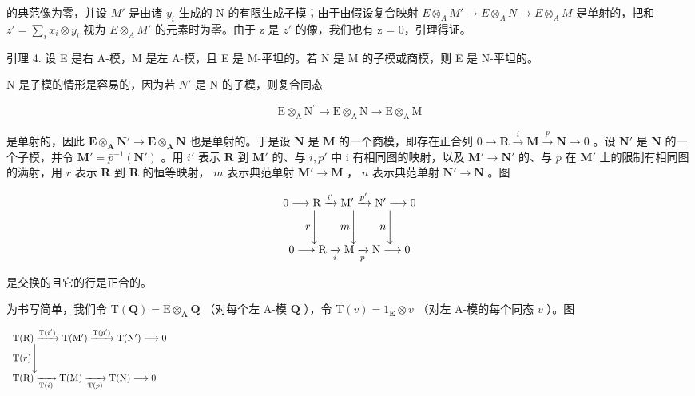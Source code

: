 的典范像为零，并设 \(M'\) 是由诸 \(y_{i}\) 生成的 N 的有限生成子模；由于由假设复合映射 \(E \otimes_{A} M' \to E \otimes_{A} N \to E \otimes_{A} M\) 是单射的，把和 \(z' = \sum_{i} x_{i} \otimes y_{i}\) 视为 \(E \otimes_{A} M'\) 的元素时为零。由于 z 是 \(z'\) 的像，我们也有 z = 0，引理得证。

引理 4. 设 E 是右 A-模，M 是左 A-模，且 E 是 M-平坦的。若 N 是 M 的子模或商模，则 E 是 N-平坦的。

N 是子模的情形是容易的，因为若 \(N'\) 是 N 的子模，则复合同态

\[
\mathrm{E} \otimes_ {\mathrm{A}} \mathrm{N} ^ {\prime} \rightarrow \mathrm{E} \otimes_ {\mathrm{A}} \mathrm{N} \rightarrow \mathrm{E} \otimes_ {\mathrm{A}} \mathrm{M}
\]

是单射的，因此 \(\mathbf{E} \otimes_{\mathbf{A}} \mathbf{N}' \to \mathbf{E} \otimes_{\mathbf{A}} \mathbf{N}\) 也是单射的。于是设 \(\mathbf{N}\) 是 \(\mathbf{M}\) 的一个商模，即存在正合列 \(0 \to \mathbf{R} \xrightarrow{i} \mathbf{M} \xrightarrow{p} \mathbf{N} \to 0\) 。设 \(\mathbf{N}'\) 是 \(\mathbf{N}\) 的一个子模，并令 \(\mathbf{M}' = \bar{p}^{-1}(\mathbf{N}')\) 。用 \(i'\) 表示 \(\mathbf{R}\) 到 \(\mathbf{M}'\) 的、与 \(i, p'\) 中 i 有相同图的映射，以及 \(\mathbf{M}' \to \mathbf{N}'\) 的、与 \(p\) 在 \(\mathbf{M}'\) 上的限制有相同图的满射，用 \(r\) 表示 \(\mathbf{R}\) 到 \(\mathbf{R}\) 的恒等映射， \(m\) 表示典范单射 \(\mathbf{M}' \to \mathbf{M}\) ， \(n\) 表示典范单射 \(\mathbf{N}' \to \mathbf{N}\) 。图

\[
\begin{array}{c} 0 \longrightarrow \mathrm{R} \xrightarrow {i ^ {\prime}} \mathrm{M} ^ {\prime} \xrightarrow {p ^ {\prime}} \mathrm{N} ^ {\prime} \longrightarrow 0 \\ r \Biggl \downarrow \qquad m \Biggl \downarrow \qquad n \Biggl \downarrow \\ 0 \longrightarrow \mathrm{R} \xrightarrow [ i ]{} \mathrm{M} \xrightarrow [ p ]{} \mathrm{N} \longrightarrow 0 \end{array}
\]

是交换的且它的行是正合的。

为书写简单，我们令 \(\mathrm{T}(\mathbf{Q}) = \mathrm{E} \otimes_{\mathbf{A}} \mathbf{Q}\) （对每个左 A-模 \(\mathbf{Q}\) ），令 \(\mathrm{T}(v) = 1_{\mathbf{E}} \otimes v\) （对左 A-模的每个同态 \(v\) ）。图

\[
\begin{array}{l} \mathrm{T} (\mathrm{R}) \xrightarrow {\mathrm{T} (i ^ {\prime})} \mathrm{T} (\mathrm{M} ^ {\prime}) \xrightarrow {\mathrm{T} (p ^ {\prime})} \mathrm{T} (\mathrm{N} ^ {\prime}) \longrightarrow 0 \\ \mathrm{T} (r) \Bigg \downarrow \qquad \qquad \qquad \qquad \qquad \qquad \qquad \qquad \qquad \qquad \qquad \qquad \qquad \qquad \qquad \qquad \qquad \qquad \qquad \qquad \qquad \qquad \qquad \qquad \qquad \qquad \qquad \qquad \qquad \qquad \qquad \qquad \qquad \qquad \\ \mathrm{T} (\mathrm{R}) \xrightarrow [ \mathrm{T} (i) ]{} \mathrm{T} (\mathrm{M}) \xrightarrow [ \mathrm{T} (p) ]{} \mathrm{T} (\mathrm{N}) \longrightarrow 0 \end{array}
\]

